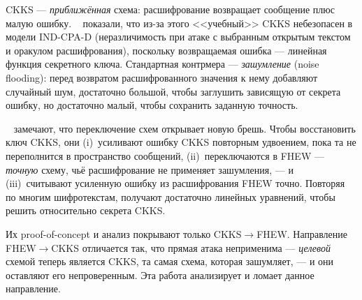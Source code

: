 \documentclass[11pt]{article}
\newcommand{\fto}{\texorpdfstring{FHEW$\to$CKKS}{FHEW-to-CKKS}}
\newcommand{\ctf}{\texorpdfstring{CKKS$\to$FHEW}{CKKS-to-FHEW}}
\begin{document}
CKKS --- \emph{приближённая} схема: расшифрование возвращает сообщение плюс малую ошибку.
\citeauthor{limicciancio2021}~\cite{limicciancio2021} показали, что из-за этого <<учебный>> CKKS
небезопасен в модели IND-CPA-D (неразличимость при атаке с выбранным открытым текстом и оракулом
расшифрования), поскольку возвращаемая ошибка --- линейная функция секретного ключа. Стандартная
контрмера --- \emph{зашумление} (noise flooding): перед возвратом расшифрованного значения к нему
добавляют случайный шум, достаточно большой, чтобы заглушить зависящую от секрета ошибку, но
достаточно малый, чтобы сохранить заданную точность.

\citeauthor{santato2026}~\cite{santato2026} замечают, что переключение схем открывает новую брешь.
Чтобы восстановить ключ CKKS, они (i)~усиливают ошибку CKKS повторным удвоением, пока та не
переполнится в пространство сообщений, (ii)~переключаются в FHEW --- \emph{точную} схему, чьё
расшифрование не применяет зашумления, --- и (iii)~считывают усиленную ошибку из расшифрования
FHEW точно. Повторяя по многим шифротекстам, получают достаточно линейных уравнений, чтобы решить
относительно секрета CKKS.

Их proof-of-concept и анализ покрывают только \ctf{}. Направление \fto{} отличается так, что прямая
атака неприменима --- \emph{целевой} схемой теперь является CKKS, та самая схема, которая зашумляет,
--- и они оставляют его непроверенным. Эта работа анализирует и ломает данное направление.
\end{document}
